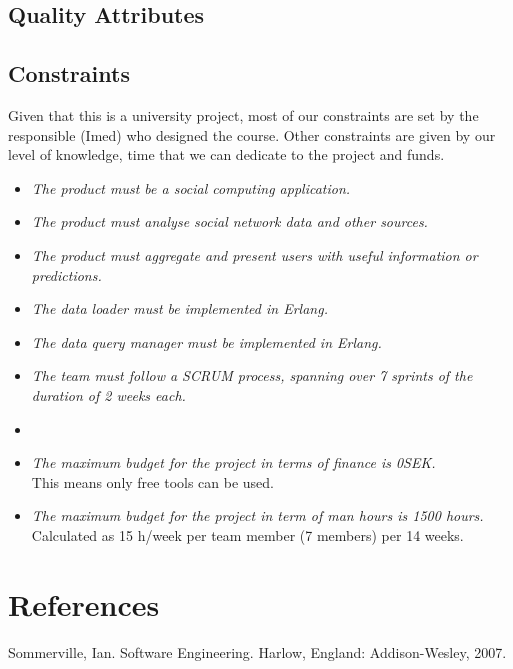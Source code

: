 \documentclass{article}
\begin{document}
\subsection{Quality Attributes}




\subsection{Constraints}
Given that this is a university project, most of our constraints are set by the responsible (Imed) who designed the course. Other constraints are given by our level of knowledge, time that we can dedicate to the project and funds.
\begin{itemize}
\item \textit{The product must be a social computing application.}
\item \textit{The product must analyse social network data and other sources.}
\item \textit{The product must aggregate and present users with useful information or predictions.}
\item \textit{The data loader must be implemented in Erlang.}
\item \textit{The data query manager must be implemented in Erlang.}
\item \textit{The team must follow a SCRUM process, spanning over 7 sprints of the duration of 2 weeks each.}
\item {}
\item \textit{The maximum budget for the project in terms of finance is 0SEK.}\\
This means only free tools can be used.
\item \textit{The maximum budget for the project in term of man hours is 1500 hours.}\\
Calculated as 15 h/week per team member (7 members) per 14 weeks.
\end{itemize}


\section{References}
Sommerville, Ian. Software Engineering. Harlow, England: Addison-Wesley, 2007.
\end{document}
